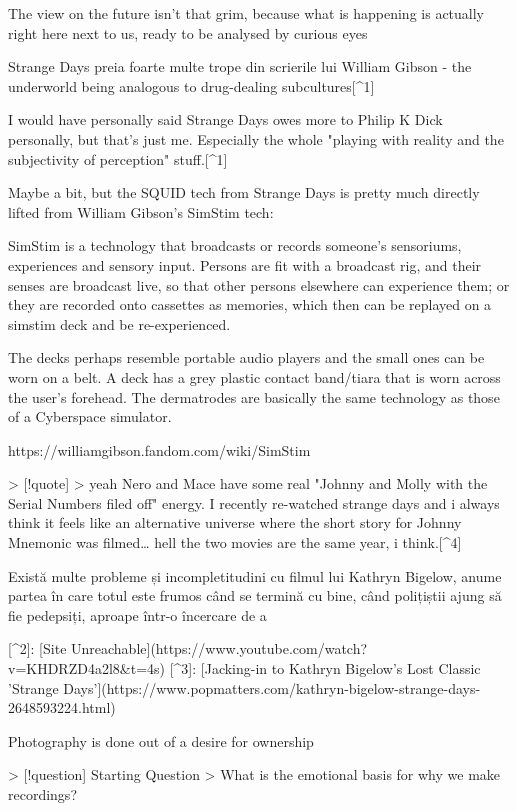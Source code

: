 \documentclass[a4paper, 12pt]{article}
\begin{document}
The view on the future isn't that grim, because what is happening is actually right here next to us, ready to be analysed by curious eyes

Strange Days preia foarte multe trope din scrierile lui William Gibson
- the underworld being analogous to drug-dealing subcultures[^1]

I would have personally said Strange Days owes more to Philip K Dick personally, but that's just me. Especially the whole "playing with reality and the subjectivity of perception" stuff.[^1]

Maybe a bit, but the SQUID tech from Strange Days is pretty much directly lifted from William Gibson's SimStim tech:

SimStim is a technology that broadcasts or records someone's sensoriums, experiences and sensory input. Persons are fit with a broadcast rig, and their senses are broadcast live, so that other persons elsewhere can experience them; or they are recorded onto cassettes as memories, which then can be replayed on a simstim deck and be re-experienced.

The decks perhaps resemble portable audio players and the small ones can be worn on a belt. A deck has a grey plastic contact band/tiara that is worn across the user's forehead. The dermatrodes are basically the same technology as those of a Cyberspace simulator.

https://williamgibson.fandom.com/wiki/SimStim

> [!quote]
> yeah Nero and Mace have some real "Johnny and Molly with the Serial Numbers filed off" energy. I recently re-watched strange days and i always think it feels like an alternative universe where the short story for Johnny Mnemonic was filmed… hell the two movies are the same year, i think.[^4]

Există multe probleme și incompletitudini cu filmul lui Kathryn Bigelow, anume partea în care totul este frumos când se termină cu bine, când polițiștii ajung să fie pedepsiți, aproape într-o încercare de a

[^2]: [Site Unreachable](https://www.youtube.com/watch?v=KHDRZD4a2l8&t=4s)
[^3]: [Jacking-in to Kathryn Bigelow's Lost Classic 'Strange Days'](https://www.popmatters.com/kathryn-bigelow-strange-days-2648593224.html)

Photography is done out of a desire for ownership

> [!question] Starting Question
> What is the emotional basis for why we make recordings?
\end{document}
